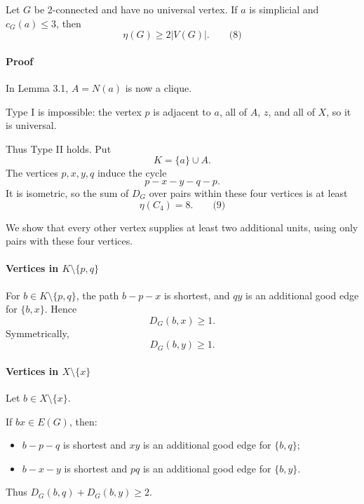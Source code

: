 \documentclass[
  11pt,
  a4paper,
]{article}
\providecommand{\tightlist}{%
  \setlength{\itemsep}{0pt}\setlength{\parskip}{0pt}}
\begin{document}
Let \(G\) be 2-connected and have no universal vertex. If \(a\) is
simplicial and \(c_G(a)\le3\), then \[
\eta(G)\ge2|V(G)|.
\qquad\text{(8)}
\]

\paragraph{Proof}\label{proof-3}

In Lemma 3.1, \(A=N(a)\) is now a clique.

Type I is impossible: the vertex \(p\) is adjacent to \(a\), all of
\(A\), \(z\), and all of \(X\), so it is universal.

Thus Type II holds. Put \[
K=\{a\}\cup A.
\] The vertices \(p,x,y,q\) induce the cycle \[
p-x-y-q-p.
\] It is isometric, so the sum of \(D_G\) over pairs within these four
vertices is at least \[
\eta(C_4)=8.
\qquad\text{(9)}
\]

We show that every other vertex supplies at least two additional units,
using only pairs with these four vertices.

\paragraph{\texorpdfstring{Vertices in
\(K\setminus\{p,q\}\)}{Vertices in K\textbackslash setminus\textbackslash\{p,q\textbackslash\}}}\label{vertices-in-ksetminuspq}

For \(b\in K\setminus\{p,q\}\), the path \(b-p-x\) is shortest, and
\(qy\) is an additional good edge for \(\{b,x\}\). Hence \[
D_G(b,x)\ge1.
\] Symmetrically, \[
D_G(b,y)\ge1.
\]

\paragraph{\texorpdfstring{Vertices in
\(X\setminus\{x\}\)}{Vertices in X\textbackslash setminus\textbackslash\{x\textbackslash\}}}\label{vertices-in-xsetminusx}

Let \(b\in X\setminus\{x\}\).

If \(bx\in E(G)\), then:

\begin{itemize}
\tightlist
\item
  \(b-p-q\) is shortest and \(xy\) is an additional good edge for
  \(\{b,q\}\);
\item
  \(b-x-y\) is shortest and \(pq\) is an additional good edge for
  \(\{b,y\}\).
\end{itemize}

Thus \(D_G(b,q)+D_G(b,y)\ge2\).
\end{document}
